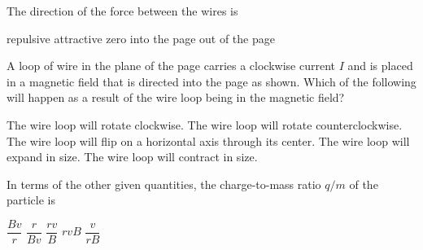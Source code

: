 \documentclass{../../../oss-apphys-exam}
\begin{document}
\begin{multicols*}{2}
\begin{questions}
    \question The direction of the force between the wires is
    \begin{choices}
      \choice repulsive
      \choice attractive
      \choice zero
      \choice into the page
      \choice out of the page
    \end{choices}
    \label{q:2curr2}
    
    \question A loop of wire in the plane of the page carries a clockwise
    current $I$ and is placed in a magnetic field that is directed into the
    page as shown. Which of the following will happen as a result of the wire
    loop being in the magnetic field?
    \begin{center}
    \end{center}
    \begin{choices}
      \choice The wire loop will rotate clockwise.
      \choice The wire loop will rotate counterclockwise.
      \choice The wire loop will flip on a horizontal axis through its center.
      \choice The wire loop will expand in size.
      \choice The wire loop will contract in size.
    \end{choices}
    \vspace{.7in}


    \question In terms of the other given quantities, the charge-to-mass ratio
    $q/m$ of the particle is
    \begin{choices}
      \choice $\dfrac{Bv}{r}$
      \choice $\dfrac{r}{Bv}$
      \choice $\dfrac{rv}{B}$
      \choice $rvB$
      \choice $\dfrac{v}{rB}$
    \end{choices}
    \label{q:circ1}
    

\end{questions}
\end{multicols*}
\end{document}
